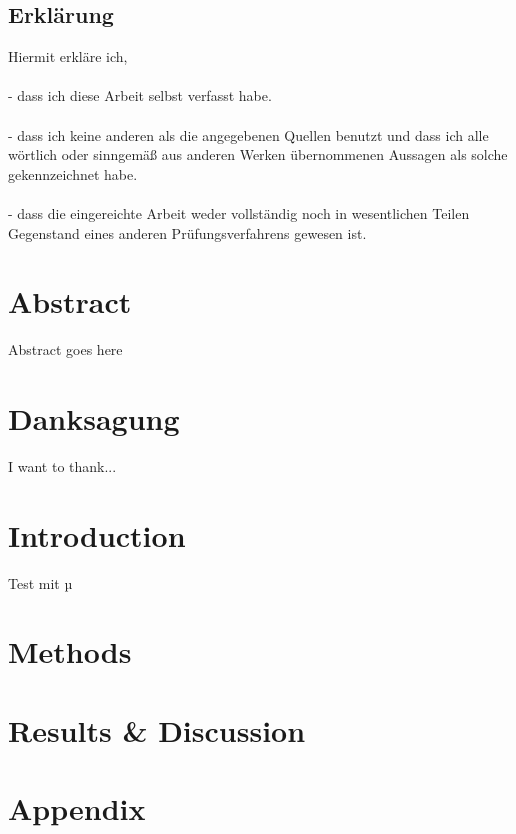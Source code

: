 





\section*{Erkl\"arung}

Hiermit erkl\"are ich,
\\
\\
- dass ich diese Arbeit selbst verfasst habe.
\\
\\
- dass ich keine anderen als die angegebenen Quellen benutzt und dass ich alle wörtlich oder sinngemäß aus anderen Werken \"ubernommenen Aussagen als solche gekennzeichnet habe.
\\
\\
- dass die eingereichte Arbeit weder vollst\"andig noch in wesentlichen Teilen Gegenstand eines anderen Pr\"ufungsverfahrens gewesen ist.

\newpage

\chapter*{Abstract}
Abstract goes here

\chapter*{Danksagung}
I want to thank...

\tableofcontents
\listoffigures
\listoftables

\chapter{Introduction}


Test mit µ

\chapter{Methods}


\chapter{Results \& Discussion}


\chapter{Appendix}


